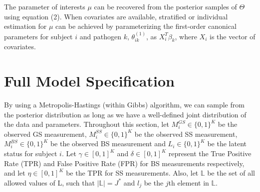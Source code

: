 \documentclass[11 pt, a4paper]{article}  %
\begin{document}
The parameter of interests $\mu$ can be recovered from the posterior samples of $\Theta$ using equation (2). When covariates are available, stratified or individual estimation for $\mu$ can be achieved by parameterizing the first-order canonical parameters for subject $i$ and pathogen $k$, $\theta^{(1)}_{ik}$, as $X_i^T\beta_k$, where $X_i$ is the vector of covariates.

\section{Full Model Specification}
By using a Metropolis-Hastings (within Gibbs) algorithm, we can sample from the posterior distribution as long as we have a well-defined joint distribution of the data and parameters. Throughout this section, let $M_i^{GS} \in \{0,1\}^K$ be the observed GS measurement, $M_i^{SS} \in \{0,1\}^K$ be the observed SS measurement, $M_i^{BS} \in \{0,1\}^K$ be the observed BS measurement and $L_i \in \{0,1\}^K$ be the latent status for subject $i$. Let $\gamma \in [0,1]^K$ and $\delta \in [0,1]^K$ represent the True Positive Rate (TPR) and False Positive Rate (FPR) for BS measurements respectively, and let $\eta \in [0,1]^K$ be the TPR for SS measurements. Also, let $\mathbb{L}$ be the set of all allowed values of L, such that $|\mathbb{L}| = J^*$ and $l_j$ be the $j$th element in $\mathbb{L}$.
\end{document}
